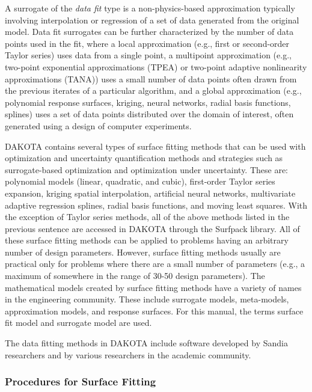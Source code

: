 A surrogate of the {\em data fit} type is a non-physics-based
approximation typically involving interpolation or regression of a set
of data generated from the original model.  Data fit surrogates can be
further characterized by the number of data points used in the fit,
where a local approximation (e.g., first or second-order Taylor
series) uses data from a single point, a multipoint approximation
(e.g., two-point exponential approximations (TPEA) or two-point
adaptive nonlinearity approximations (TANA)) uses a small number of
data points often drawn from the previous iterates of a particular
algorithm, and a global approximation (e.g., polynomial response
surfaces, kriging, neural networks, radial basis functions, splines)
uses a set of data points distributed over the domain of interest,
often generated using a design of computer experiments.

DAKOTA contains several types of surface fitting methods that can be
used with optimization and uncertainty quantification methods and
strategies such as surrogate-based optimization and optimization under
uncertainty. These are: polynomial models (linear, quadratic, and
cubic), first-order Taylor series expansion, kriging spatial
interpolation, artificial neural networks, multivariate adaptive
regression splines, radial basis functions, and moving least squares. 
With the exception of Taylor series methods, all of the above methods 
listed in the previous sentence are accessed in DAKOTA through the 
Surfpack library.  All of these surface fitting methods can be
applied to problems having an arbitrary number of design parameters.
However, surface fitting methods usually are practical only for
problems where there are a small number of parameters (e.g., a maximum
of somewhere in the range of 30-50 design parameters). The
mathematical models created by surface fitting methods have a variety
of names in the engineering community. These include surrogate models,
meta-models, approximation models, and response surfaces. For this
manual, the terms surface fit model and surrogate model are used.

The data fitting methods in DAKOTA include software developed by
Sandia researchers and by various researchers in the academic
community.

\subsubsection{Procedures for Surface Fitting}\label{models:surf:procedures}


